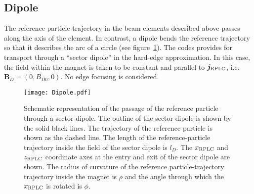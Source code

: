 \subsection{Dipole}

The reference particle trajectory in the beam elements described above
passes along the axis of the element.
In contrast, a dipole bends the reference trajectory so that it
describes the arc of a circle (see figure~\ref{fig:Dipole}).
The codes provides for transport through a ``sector dipole'' in the
hard-edge approximation.
In this case, the field within the magnet is taken to be constant and
parallel to $\bm{j}_{\rm RPLC}$, i.e. $\bm{B}_D = (0, B_{D0}, 0)$. 
No edge focusing is considered.
\begin{figure}
  \begin{center}
    \texttt{[image: Dipole.pdf]}
  \end{center}
  \caption{
    Schematic representation of the passage of the reference particle
    through a sector dipole.
    The outline of the sector dipole is shown by the solid black
    lines.
    The trajectory of the reference particle is shown as the dashed
    line.
    The length of the reference-particle trajectory inside the field
    of the sector dipole is $l_D$.
    The $x_{\rm RPLC}$ and $z_{\rm RPLC}$ coordinate axes at the entry
    and exit of the sector dipole are shown.
    The radius of curvature of the reference particle-trajectory
    trajectory inside the magnet is $\rho$ and the angle through which
    the $x_{\rm RPLC}$ is rotated is $\phi$.
  }
  \label{fig:Dipole}
\end{figure}

